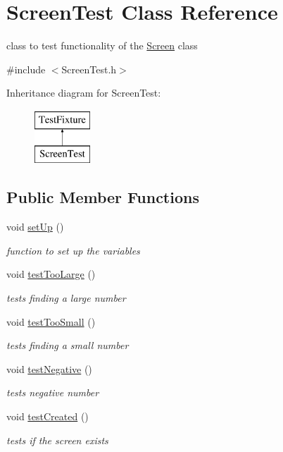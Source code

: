 \hypertarget{classScreenTest}{\section{Screen\-Test Class Reference}
\label{classScreenTest}
}


class to test functionality of the \hyperlink{classScreen}{Screen} class  




{\ttfamily \#include $<$Screen\-Test.\-h$>$}

Inheritance diagram for Screen\-Test\-:\begin{figure}[H]
\begin{center}
\leavevmode
\includegraphics[height=2.000000cm]{classScreenTest}
\end{center}
\end{figure}
\subsection*{Public Member Functions}
\begin{DoxyCompactItemize}
\item 
void \hyperlink{classScreenTest_a7eadae1233e3a94cc10b1f9defb66882}{set\-Up} ()
\begin{DoxyCompactList}\small\item\em function to set up the variables \end{DoxyCompactList}\item 
void \hyperlink{classScreenTest_a779a3a2e83e9e169475e0d70049ceacb}{test\-Too\-Large} ()
\begin{DoxyCompactList}\small\item\em tests finding a large number \end{DoxyCompactList}\item 
void \hyperlink{classScreenTest_a3b09794a59af0142d36fade9aa311aa4}{test\-Too\-Small} ()
\begin{DoxyCompactList}\small\item\em tests finding a small number \end{DoxyCompactList}\item 
void \hyperlink{classScreenTest_ab62c1ff5c4f56cbb861e4a5540f43cc1}{test\-Negative} ()
\begin{DoxyCompactList}\small\item\em tests negative number \end{DoxyCompactList}\item 
void \hyperlink{classScreenTest_a4595a99a5ebbf7ee134cd6538ecace67}{test\-Created} ()
\begin{DoxyCompactList}\small\item\em tests if the screen exists \end{DoxyCompactList}\end{DoxyCompactItemize}


